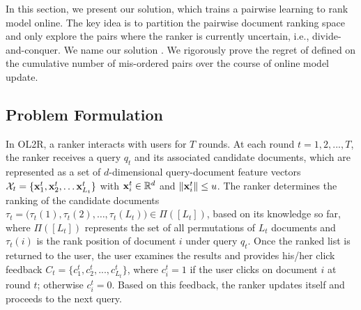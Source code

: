 In this section, we present our solution, which trains a pairwise learning to rank model online. The key idea is to partition the pairwise document ranking space and only explore the pairs where the ranker is currently uncertain, i.e., divide-and-conquer. We name our solution \model{}. We rigorously prove the regret of \model{} defined on the cumulative number of mis-ordered pairs over the course of online model update. 

\subsection{Problem Formulation}
\label{sec:problem}



In OL2R, a ranker interacts with users for $T$ rounds. At each round $t=1,2,...,T$, the ranker receives a query $q_t$ and its associated candidate documents, 
which are represented as a set of $d$-dimensional query-document feature vectors $\mathcal{X}_t = \{\mathbf{x}_1^t, \mathbf{x}_2^t, \dots \mathbf{x}_{L_t}^t\}$ with $\mathbf{x}^t_i \in \mathbb{R}^d$ and $\Vert\mathbf{x}_i^t\Vert \leq u$. The ranker determines the ranking of the candidate documents $\tau_t = \big(\tau_t(1), \tau_t(2), \dots, \tau_t(L_t)\big) \in \Pi([L_t])$, based on its knowledge so far, where $\Pi([L_t])$ represents the set of all permutations of $L_t$ documents and $\tau_t(i)$ is the rank position of document $i$ under query $q_t$. Once the ranked list is returned to the user, the user examines the results and provides his/her click feedback $C_t = \{c_1^t, c_2^t, ..., c_{L_t}^t\}$, where $c_i^t = 1$ if the user clicks on document $i$ at round $t$; otherwise $c_i^t = 0$. Based on this feedback, the ranker updates itself and proceeds to the next query.

